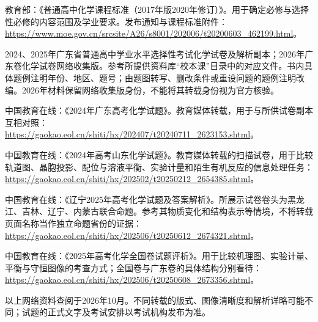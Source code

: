 \begin{enumerate}[label={[\arabic*]},leftmargin=2em,itemsep=0.5em]
\item 教育部：《普通高中化学课程标准（2017年版2020年修订）》。用于确定必修与选择性必修的内容范围及学业要求。发布通知与课程标准附件：\\
\url{https://www.moe.gov.cn/srcsite/A26/s8001/202006/t20200603_462199.html}。

\item 2024、2025年广东省普通高中学业水平选择性考试化学试卷及解析副本；2026年广东卷化学试卷网络收集版。参考所提供资料库“校本课”目录中的对应文件。书内具体题例注明年份、地区、题号；由题图转写、删改条件或重设问题的题例注明改编。2026年材料保留网络收集版身份，不能将其转载身份视为官方核验。

\item 中国教育在线：《2024年广东高考化学试题》。教育媒体转载，用于与所供试卷副本互相对照：\\
\url{https://gaokao.eol.cn/shiti/hx/202407/t20240711_2623153.shtml}。

\item 中国教育在线：《2024年高考山东化学试题》。教育媒体转载的扫描试卷，用于比较轨道图、晶胞投影、配位与溶液平衡、实验计量和陌生有机反应的信息处理任务：\\
\url{https://gaokao.eol.cn/shiti/hx/202502/t20250212_2654385.shtml}。

\item 中国教育在线：《辽宁2025年高考化学试题及答案解析》。所展示试卷卷头为黑龙江、吉林、辽宁、内蒙古联合命题。参考其物质变化和结构表示等情境，不将转载页面名称当作独立命题省份的证据：\\
\url{https://gaokao.eol.cn/shiti/hx/202506/t20250612_2674321.shtml}。

\item 中国教育在线：《2025年高考化学全国卷试题评析》。用于比较机理图、实验计量、平衡与守恒图像的考查方式；全国卷与广东卷的具体结构分别看待：\\
\url{https://gaokao.eol.cn/shiti/hx/202506/t20250608_2673356.shtml}。
\end{enumerate}

\noindent 以上网络资料查阅于2026年10月。不同转载的版式、图像清晰度和解析详略可能不同；试题的正式文字及考试安排以考试机构发布为准。
